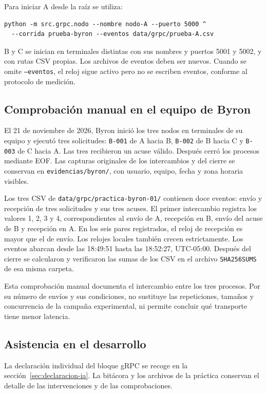 \documentclass[11pt,a4paper]{article}
\begin{document}
Para iniciar A desde la raíz se utiliza:

\begin{verbatim}
python -m src.grpc.nodo --nombre nodo-A --puerto 5000 ^
  --corrida prueba-byron --eventos data/grpc/prueba-A.csv
\end{verbatim}

B y C se inician en terminales distintas con sus nombres y puertos
5001 y 5002, y con rutas CSV propias. Los archivos de eventos deben ser
nuevos. Cuando se omite \texttt{--eventos}, el reloj sigue activo pero
no se escriben eventos, conforme al protocolo de medición.

\subsection{Comprobación manual en el equipo de Byron}

El 21 de noviembre de 2026, Byron inició los tres nodos en terminales
de su equipo y ejecutó tres solicitudes: \texttt{B-001} de A hacia B,
\texttt{B-002} de B hacia C y \texttt{B-003} de C hacia A. Las tres
recibieron un acuse válido. Después cerró los procesos mediante EOF.
Las capturas originales de los intercambios y del cierre se conservan
en \texttt{evidencias/byron/}, con usuario, equipo, fecha y zona horaria
visibles.

Los tres CSV de \texttt{data/grpc/practica-byron-01/} contienen doce
eventos: envío y recepción de tres solicitudes y sus tres acuses.
El primer intercambio registra los valores 1, 2, 3 y 4, correspondientes
al envío de A, recepción en B, envío del acuse de B y recepción en A.
En los seis pares registrados, el reloj de recepción es mayor que el
de envío. Los relojes locales también crecen estrictamente.
Los eventos abarcan desde las 18:49:51 hasta las 18:52:27, UTC-05:00.
Después del cierre se calcularon y verificaron las sumas de los CSV
en el archivo \texttt{SHA256SUMS} de esa misma carpeta.

Esta comprobación manual documenta el intercambio entre los tres
procesos. Por su número de envíos y sus condiciones, no sustituye
las repeticiones, tamaños y concurrencia de la campaña experimental,
ni permite concluir qué transporte tiene menor latencia.

\subsection{Asistencia en el desarrollo}

La declaración individual del bloque gRPC se recoge en la
sección~\ref{sec:declaracion-ia}. La bitácora y los archivos de la práctica
conservan el detalle de las intervenciones y de las comprobaciones.
\end{document}
